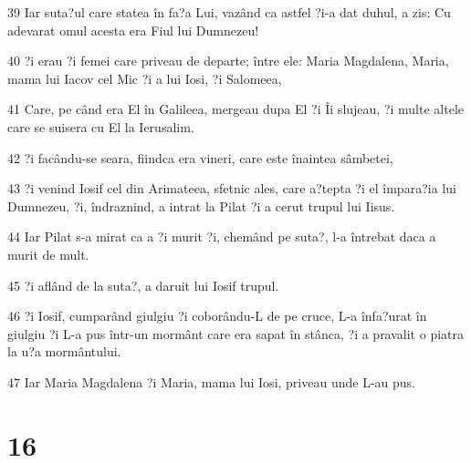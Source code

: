 \par 39 Iar suta?ul care statea în fa?a Lui, vazând ca astfel ?i-a dat duhul, a zis: Cu adevarat omul acesta era Fiul lui Dumnezeu!
\par 40 ?i erau ?i femei care priveau de departe; între ele: Maria Magdalena, Maria, mama lui Iacov cel Mic ?i a lui Iosi, ?i Salomeea,
\par 41 Care, pe când era El în Galileea, mergeau dupa El ?i Îi slujeau, ?i multe altele care se suisera cu El la Ierusalim.
\par 42 ?i facându-se seara, fiindca era vineri, care este înaintea sâmbetei,
\par 43 ?i venind Iosif cel din Arimateea, sfetnic ales, care a?tepta ?i el împara?ia lui Dumnezeu, ?i, îndraznind, a intrat la Pilat ?i a cerut trupul lui Iisus.
\par 44 Iar Pilat s-a mirat ca a ?i murit ?i, chemând pe suta?, l-a întrebat daca a murit de mult.
\par 45 ?i aflând de la suta?, a daruit lui Iosif trupul.
\par 46 ?i Iosif, cumparând giulgiu ?i coborându-L de pe cruce, L-a înfa?urat în giulgiu ?i L-a pus într-un mormânt care era sapat în stânca, ?i a pravalit o piatra la u?a mormântului.
\par 47 Iar Maria Magdalena ?i Maria, mama lui Iosi, priveau unde L-au pus.

\chapter{16}

